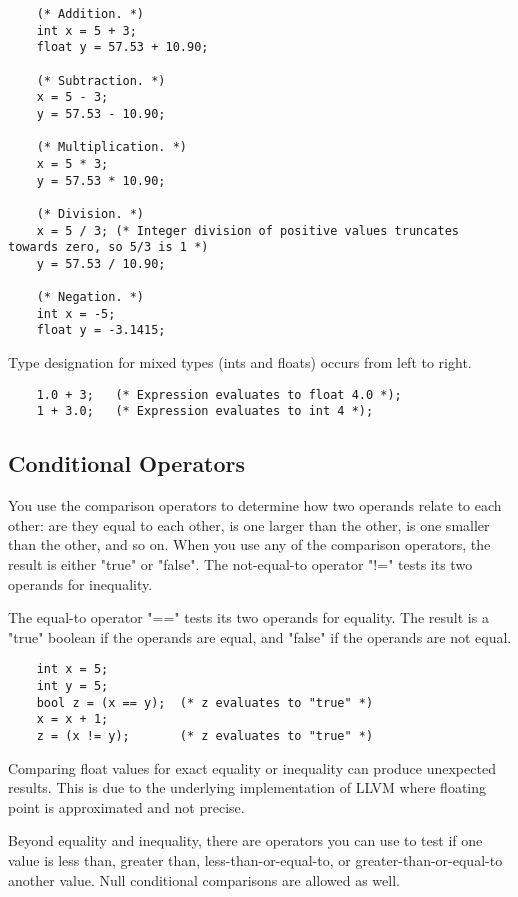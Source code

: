 \begin{homeworkProblem}
	\begin{verbatim}
	(* Addition. *)
	int x = 5 + 3;   
	float y = 57.53 + 10.90;
	
	(* Subtraction. *)
	x = 5 - 3;
	y = 57.53 - 10.90;
	
	(* Multiplication. *)
	x = 5 * 3;
	y = 57.53 * 10.90;
	
	(* Division. *)
	x = 5 / 3; (* Integer division of positive values truncates towards zero, so 5/3 is 1 *)
	y = 57.53 / 10.90;
	
	(* Negation. *)
	int x = -5;
	float y = -3.1415;
	\end{verbatim}

	Type designation for mixed types (ints and floats) occurs from left to right.

	\begin{verbatim}
	1.0 + 3;   (* Expression evaluates to float 4.0 *);
	1 + 3.0;   (* Expression evaluates to int 4 *);
	\end{verbatim}
	
	\subsection{Conditional Operators}
	
	You use the comparison operators to determine how two operands relate to each other: are they equal to each other, is one larger than the other, is one smaller than the other, and so on. When you use any of the comparison operators, the result is either "true" or "false". The not-equal-to operator "!=" tests its two operands for inequality.
	
	The equal-to operator "==" tests its two operands for equality. The result is a "true" boolean if the operands are equal, and "false" if the operands are not equal.
	\begin{verbatim}
	int x = 5;
	int y = 5;
	bool z = (x == y);  (* z evaluates to "true" *)
	x = x + 1;
	z = (x != y);       (* z evaluates to "true" *)
	\end{verbatim}

	Comparing float values for exact equality or inequality can produce unexpected results. This is due to the underlying implementation of LLVM where floating point is approximated and not precise. 
	
	Beyond equality and inequality, there are operators you can use to test if one value is less than, greater than, less-than-or-equal-to, or greater-than-or-equal-to another value. Null conditional comparisons are allowed as well. 
	

\end{homeworkProblem}
